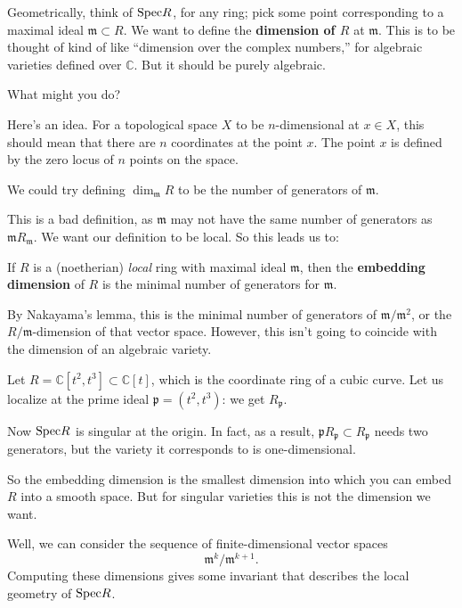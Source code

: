 Geometrically, think of $\mathrm{Spec} R$, for any ring; pick some point corresponding to a maximal
ideal $\mathfrak{m} \subset R$. We want to define the \textbf{dimension of $R$}
at $\mathfrak{m}$. This is to be thought of kind of like ``dimension over the
complex numbers,'' for algebraic varieties defined over $\mathbb{C}$. But it
should be purely algebraic. 

What might you do?


Here's an idea. For a topological space $X$ to be $n$-dimensional at $x \in X$, this should
mean that there are $n$ coordinates at the point $x$. The point $x$ is defined
by the zero locus of $n$ points on the space.

\begin{definition}[Proposal] We could try defining $\dim_{\mathfrak{m}} R$
to be the number of generators of $\mathfrak{m}$.
\end{definition} 

This is a bad definition, as $\mathfrak{m}$ may not have the same number of
generators as $\mathfrak{m}R_{\mathfrak{m}}$.	We want our definition to be
local.
So this leads us to:
\begin{definition} 
If $R$ is a (noetherian) \emph{local} ring with maximal ideal $\mathfrak{m}$, then the \textbf{embedding dimension} of $R$ is
the minimal number of generators for $\mathfrak{m}$.
\end{definition} 

By Nakayama's lemma, this is the minimal number of generators of
$\mathfrak{m}/\mathfrak{m}^2$, or the $R/\mathfrak{m}$-dimension of that vector
space.
However, this isn't going to coincide with the dimension of an algebraic
variety.

\begin{example} 
Let $R = \mathbb{C}[t^2, t^3] \subset \mathbb{C}[t]$, which is the coordinate
ring of a cubic curve. Let us localize at the prime ideal $\mathfrak{p} = (t^2,
t^3)$: we get $R_{\mathfrak{p}}$. 

Now $\mathrm{Spec} R$ is singular at the origin. In fact, as a result, $\mathfrak{p}
R_{\mathfrak{p}} \subset R_{\mathfrak{p}}$ needs two generators, but the
variety it corresponds to is one-dimensional.
\end{example} 

So the embedding dimension is the smallest dimension into which you can embed
$R$ into a smooth space.
But for singular varieties this is not the dimension we want. 

Well, we can consider the sequence of finite-dimensional vector spaces
\[ \mathfrak{m}^k/\mathfrak{m}^{k+1}.  \]
Computing these dimensions gives some invariant that describes the local
geometry of $\mathrm{Spec} R$.

